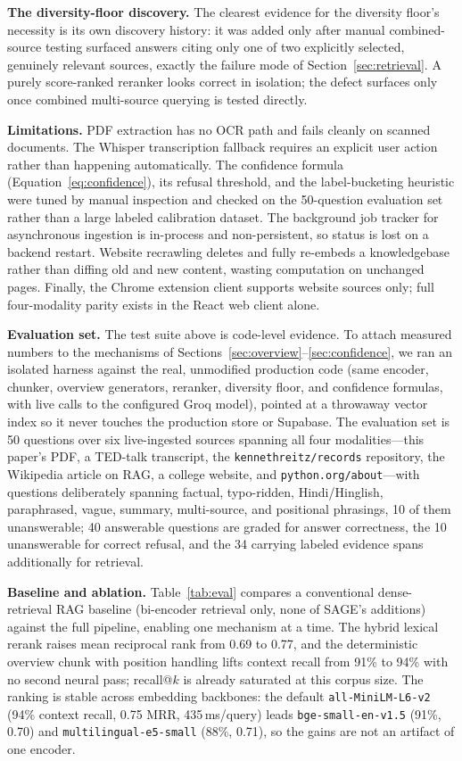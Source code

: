 \documentclass[conference]{IEEEtran}
\begin{document}
\textbf{The diversity-floor discovery.} The clearest evidence for the diversity floor's necessity is its own discovery history: it was added only after manual combined-source testing surfaced answers citing only one of two explicitly selected, genuinely relevant sources, exactly the failure mode of Section~\ref{sec:retrieval}. A purely score-ranked reranker looks correct in isolation; the defect surfaces only once combined multi-source querying is tested directly.

\textbf{Limitations.} PDF extraction has no OCR path and fails cleanly on scanned documents. The Whisper transcription fallback requires an explicit user action rather than happening automatically. The confidence formula (Equation~\ref{eq:confidence}), its refusal threshold, and the label-bucketing heuristic were tuned by manual inspection and checked on the 50-question evaluation set rather than a large labeled calibration dataset. The background job tracker for asynchronous ingestion is in-process and non-persistent, so status is lost on a backend restart. Website recrawling deletes and fully re-embeds a knowledgebase rather than diffing old and new content, wasting computation on unchanged pages. Finally, the Chrome extension client supports website sources only; full four-modality parity exists in the React web client alone.

\label{sec:experiments}
\textbf{Evaluation set.} The test suite above is code-level evidence. To attach measured numbers to the mechanisms of Sections~\ref{sec:overview}--\ref{sec:confidence}, we ran an isolated harness against the real, unmodified production code (same encoder, chunker, overview generators, reranker, diversity floor, and confidence formulas, with live calls to the configured Groq model), pointed at a throwaway vector index so it never touches the production store or Supabase. The evaluation set is 50 questions over six live-ingested sources spanning all four modalities---this paper's PDF, a TED-talk transcript, the \texttt{kennethreitz/records} repository, the Wikipedia article on RAG, a college website, and \texttt{python.org/about}---with questions deliberately spanning factual, typo-ridden, Hindi/Hinglish, paraphrased, vague, summary, multi-source, and positional phrasings, 10 of them unanswerable; 40 answerable questions are graded for answer correctness, the 10 unanswerable for correct refusal, and the 34 carrying labeled evidence spans additionally for retrieval.

\textbf{Baseline and ablation.} Table~\ref{tab:eval} compares a conventional dense-retrieval RAG baseline (bi-encoder retrieval only, none of SAGE's additions) against the full pipeline, enabling one mechanism at a time. The hybrid lexical rerank raises mean reciprocal rank from 0.69 to 0.77, and the deterministic overview chunk with position handling lifts context recall from 91\% to 94\% with no second neural pass; recall@$k$ is already saturated at this corpus size. The ranking is stable across embedding backbones: the default \texttt{all-MiniLM-L6-v2} (94\% context recall, 0.75 MRR, 435\,ms/query) leads \texttt{bge-small-en-v1.5} (91\%, 0.70) and \texttt{multilingual-e5-small} (88\%, 0.71), so the gains are not an artifact of one encoder.
\end{document}
